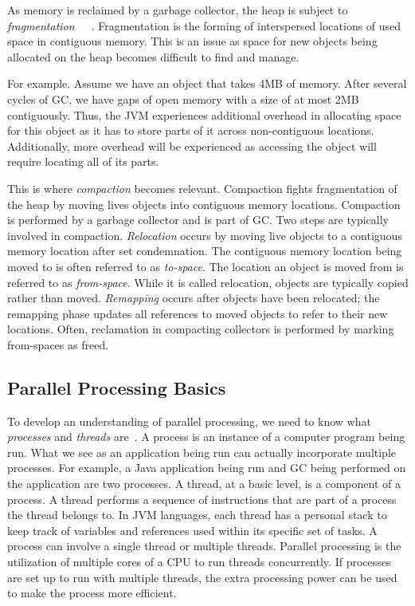 \documentclass{sig-alternate}
\begin{document}
As memory is reclaimed by a garbage collector, the heap is subject to 
\emph{fragmentation}~\cite{Tene:C4}~\cite{Iyengar:Collie}~\cite{Osterlund:FPP}. Fragmentation is the forming
of interspersed locations of used space in contiguous memory. This
is an issue as space for new objects being allocated
on the heap becomes difficult to find and manage. 

For example. Assume
we have an object that takes 4MB of memory. After several cycles of GC,
we have gaps of open memory with a size of at most 2MB contiguously. Thus, 
the JVM experiences additional overhead in allocating space for this object
as it has to store parts of it across non-contiguous locations. Additionally,
more overhead will be experienced as accessing the object will require locating
all of its parts.

This is where \emph{compaction} becomes relevant. Compaction fights
fragmentation of the heap by moving lives objects into contiguous memory locations.
Compaction is performed by a garbage collector and is part of GC. Two steps
are typically involved in compaction. \emph{Relocation} occurs by moving live objects
to a contiguous memory location after set condemnation.
The contiguous memory location being moved to is often referred to as \emph{to-space}.
The location an object is moved from is referred to as \emph{from-space}. While it is called 
relocation, objects are typically copied rather than moved. \emph{Remapping}
occurs after objects have been relocated; the remapping phase 
updates all references to moved objects to refer to their new locations. Often, reclamation
in compacting collectors is performed by marking from-spaces as freed.


\subsection{Parallel Processing Basics}
\label{sec:parallelProcessing}

To develop an understanding of parallel processing, we need to know 
what \emph{processes} and \emph{threads} are~\cite{oracle:threads}.
A process is an instance of a computer program being run. What we
see as an application being run can actually incorporate multiple processes.
For example, a Java application being run and GC being performed on the application are two processes.
A thread, at a basic level, is a component of a process. A thread performs a sequence
of instructions that are part of a process the thread belongs to. In JVM languages,
each thread has a personal stack to keep track of variables
and references used within its specific set of tasks. A process
can involve a single thread or multiple threads.
Parallel processing is the utilization of multiple
cores of a CPU to run threads concurrently. If processes are set up
to run with multiple threads, the extra processing power can be used to make 
the process more efficient.
\end{document}

